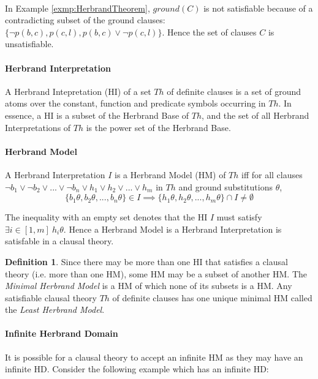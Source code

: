 \documentclass{article}
\theoremstyle{plain}
\theoremstyle{definition}
\newtheorem{defn}[thm]{Definition} %
\begin{document}
\begin{multicols}{2}
\paragraph{} In Example \ref{exmp:HerbrandTheorem}, $ground(C)$ is not satisfiable because of a contradicting subset of the ground clauses: $\{\lnot p(b, c), p(c, l), p(b, c) \lor\lnot p(c, l)\}$. Hence the set of clauses $C$ is unsatisfiable.


\paragraph{Herbrand Interpretation} A Herbrand Intepretation (HI) of a set $Th$ of definite clauses is a set of ground atoms over the constant, function and predicate symbols occurring in $Th$. In essence, a HI is a subset of the Herbrand Base of $Th$, and the set of all Herbrand Interpretations of $Th$ is the power set of the Herbrand Base.

\paragraph{Herbrand Model} A Herbrand Interpretation $I$ is a Herbrand Model (HM) of $Th$ iff for all clauses $\lnot b_1 \lor \lnot b_2 \lor ... \lor \lnot b_n \lor h_1 \lor h_2 \lor ... \lor h_m$ in $Th$ and ground substitutions $\theta$, $$\{b_1\theta, b_2\theta, ..., b_n\theta\} \in I \implies \{h_1\theta, h_2\theta, ..., h_m\theta\} \cap I \not= \emptyset$$

\noindent The inequality with an empty set denotes that the HI $I$ must satisfy $\exists i \in [1, m]\ h_i\theta$. Hence a Herbrand Model is a Herbrand Interpretation is satisfable in a clausal theory.

\begin{defn} Since there may be more than one HI that satisfies a clausal theory (i.e. more than one HM), some HM may be a subset of another HM. The \textit{Minimal Herbrand Model} is a HM of which none of its subsets is a HM. Any satisfiable clausal theory $Th$ of definite clauses has one unique minimal HM called the \textit{Least Herbrand Model}. \end{defn}

\paragraph{Infinite Herbrand Domain} It is possible for a clausal theory to accept an infinite HM as they may have an infinite HD. Consider the following example which has an infinite HD:


\end{multicols}
\end{document}
